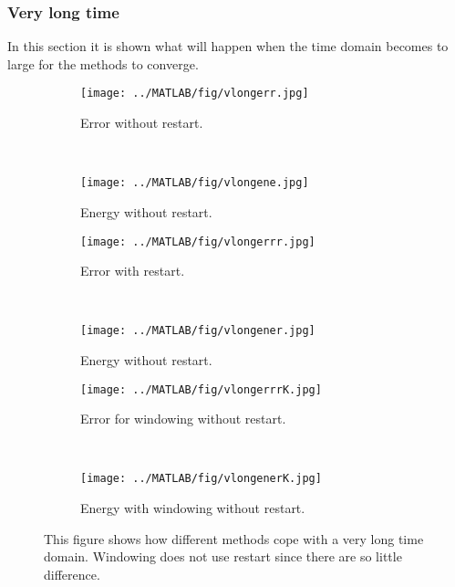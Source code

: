\subsubsection{Very long time} %
In this section it is shown what will happen when the time domain becomes to large for the methods to converge.
\label{sec:longtime}
\begin{figure}[H]
        \centering
        \begin{subfigure}[b]{0.45\textwidth}
                \texttt{[image: ../MATLAB/fig/vlongerr.jpg]}
                \caption{ Error without restart. }
                \label{fig:vlongerr}
        \end{subfigure}
		~
		\begin{subfigure}[b]{0.45\textwidth}
                \texttt{[image: ../MATLAB/fig/vlongene.jpg]}
                \caption{ Energy without restart. }
                \label{fig:vlongene}
        \end{subfigure}
        
        \begin{subfigure}[b]{0.45\textwidth}
                \texttt{[image: ../MATLAB/fig/vlongerrr.jpg]}
                \caption{ Error with restart. }
                \label{fig:vlongerrr}
        \end{subfigure}
		~
		\begin{subfigure}[b]{0.45\textwidth}
                \texttt{[image: ../MATLAB/fig/vlongener.jpg]}
                \caption{ Energy without restart. }
                \label{fig:vlongener}
        \end{subfigure}
        
        \begin{subfigure}[b]{0.45\textwidth}
                \texttt{[image: ../MATLAB/fig/vlongerrrK.jpg]}
                \caption{ Error for windowing without restart. }
                \label{fig:vlongerrrK}
        \end{subfigure}
		~
		\begin{subfigure}[b]{0.45\textwidth}
                \texttt{[image: ../MATLAB/fig/vlongenerK.jpg]}
                \caption{ Energy with windowing without restart. }
                \label{fig:vlongenerK}
        \end{subfigure}        
        
        \caption{ This figure shows how different methods cope with a very long time domain. Windowing does not use restart since there are so little difference.  }
        \label{fig:vlong}
\end{figure}
